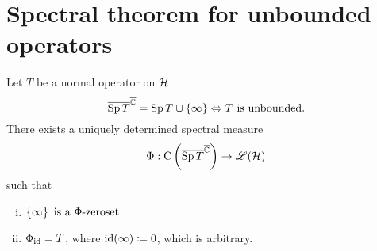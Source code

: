 \section{Spectral theorem for unbounded operators}

\begin{thrm}
 Let $T$ be a normal operator on $\mathcal{H}$.
 \[ 
 \overline{\operatorname{Sp} T}^{\overline{\mathbb{C}}} = \operatorname{Sp} T \cup \left\lbrace \infty \right\rbrace \Leftrightarrow T
 \text{ is unbounded.}
 \]
 There exists a uniquely determined spectral measure
 \[
  \Phi : \operatorname{C}\left( \overline{\operatorname{Sp} T }^{\overline{\mathbb{C}}} \right) \to \mathscr{L}(\mathcal{H})
 \]
 such that
 \begin{enumerate}[(i)]
  \item $
         \left\lbrace \infty \right\rbrace \text{ is a } \Phi\text{-zeroset}
        $
        
       
  \item $\Phi_{\operatorname{id}} = T$, where $\operatorname{id}(\infty) \coloneqq 0$, which is arbitrary.

  
 \end{enumerate}

\end{thrm}

